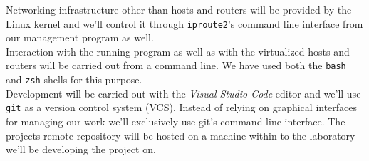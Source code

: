 \documentclass[12pt]{article}
\begin{document}
        Networking infrastructure other than hosts and routers will be provided by the Linux kernel and we'll control it through \texttt{iproute2}'s command line interface from our management program as well.\\

        Interaction with the running program as well as with the virtualized hosts and routers will be carried out from a command line. We have used both the \texttt{bash} and \texttt{zsh} shells for this purpose.\\

        Development will be carried out with the \textit{Visual Studio Code} editor and we'll use \texttt{git} as a version control system (VCS). Instead of relying on graphical interfaces for managing our work we'll exclusively use git's command line interface. The projects remote repository will be hosted on a machine within to the laboratory we'll be developing the project on.\\

    
    {}
\end{document}
